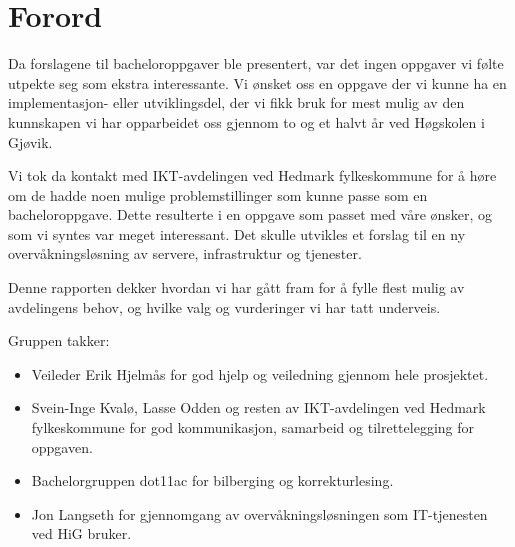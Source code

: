 \chapter*{Forord}
Da forslagene til bacheloroppgaver ble presentert, var det ingen oppgaver vi følte utpekte seg som ekstra interessante. Vi ønsket oss en oppgave der vi kunne ha en implementasjon- eller utviklingsdel, der vi fikk bruk for mest mulig av den kunnskapen vi har opparbeidet oss gjennom to og et halvt år ved Høgskolen i Gjøvik. 

Vi tok da kontakt med IKT-avdelingen ved Hedmark fylkeskommune for å høre om de hadde noen mulige problemstillinger som kunne passe som en bacheloroppgave. Dette resulterte i en oppgave som passet med våre ønsker, og som vi syntes var meget interessant. Det skulle utvikles et forslag til en ny overvåkningsløsning av servere, infrastruktur og tjenester. 

Denne rapporten dekker hvordan vi har gått fram for å fylle flest mulig av avdelingens behov, og hvilke valg og vurderinger vi har tatt underveis.
 
Gruppen takker:
\begin{itemize} 
\item Veileder Erik Hjelmås for god hjelp og veiledning gjennom hele prosjektet.
\item Svein-Inge Kvalø, Lasse Odden og resten av IKT-avdelingen ved Hedmark fylkeskommune for god kommunikasjon, samarbeid og tilrettelegging for oppgaven.
\item Bachelorgruppen dot11ac for bilberging og korrekturlesing.
\item Jon Langseth for gjennomgang av overvåkningsløsningen som IT-tjenesten ved HiG bruker.
\end{itemize}

